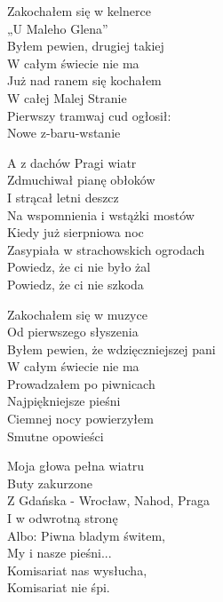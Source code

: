 \begin{text}
Zakochałem się w kelnerce\\
„U Maleho Glena”\\
Byłem pewien, drugiej takiej\\
W całym świecie nie ma\\
Już nad ranem się kochałem\\
W całej Malej Stranie\\
Pierwszy tramwaj cud ogłosił:\\
Nowe z-baru-wstanie

\vin A z dachów Pragi wiatr\\
\vin Zdmuchiwał pianę obłoków\\
\vin I strącał letni deszcz\\
\vin Na wspomnienia i wstążki mostów\\
\vin Kiedy już sierpniowa noc\\
\vin Zasypiała w strachowskich ogrodach\\
\vin Powiedz, że ci nie było żal\\
\vin Powiedz, że ci nie szkoda

Zakochałem się w muzyce\\
Od pierwszego słyszenia\\
Byłem pewien, że wdzięczniejszej pani\\
W całym świecie nie ma\\
Prowadzałem po piwnicach\\
Najpiękniejsze pieśni\\
Ciemnej nocy powierzyłem\\
Smutne opowieści

Moja głowa pełna wiatru\\
Buty zakurzone\\
Z Gdańska - Wrocław, Nahod, Praga\\
I w odwrotną stronę\\
Albo: Piwna bladym świtem,\\
My i nasze pieśni...\\
Komisariat nas wysłucha,\\
Komisariat nie śpi.
\end{text}
